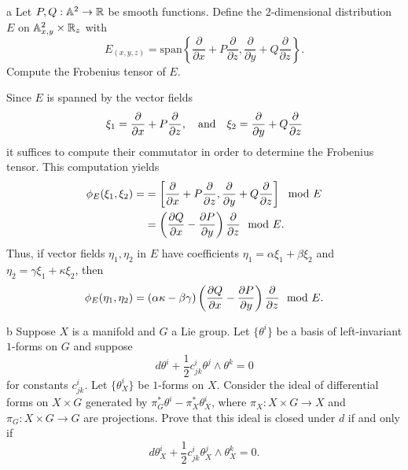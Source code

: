 \documentclass{../../templates/lkx_pset}
\begin{document}
\begin{parts}
	\begin{part}{a}
		Let $P,Q: \mathbb{A}^2 \to \mathbb{R}$ be smooth functions. Define the $2$-dimensional distribution $E$ on $\mathbb{A}^2_{x,y}\times \mathbb{R}_z$ with
		\[
			E_{(x,y,z)} = \textrm{span}\left\{\frac{\partial}{\partial x} + P \frac{\partial}{\partial z}, \frac{\partial}{\partial y} + Q \frac{\partial}{\partial z}\right\}.
		\]
		Compute the Frobenius tensor of $E$.
	\end{part}

	Since $E$ is spanned by the vector fields
	\[
		\xi_1 = \frac{\partial }{\partial x} + P\frac{\partial }{\partial z},\quad\textrm{and}\quad \xi_2 = \frac{\partial }{\partial y}+Q\frac{\partial }{\partial z}
	\]
	it suffices to compute their commutator in order to determine the Frobenius tensor. This computation yields
	\[
		\begin{aligned}
			\phi_E(\xi_1, \xi_2)=
			 & = \left[\frac{\partial }{\partial x} + P\frac{\partial }{\partial z}, \frac{\partial }{\partial y}+Q\frac{\partial }{\partial z} \right]\mod E \\
			 & = \left(\frac{\partial Q}{\partial x} - \frac{\partial P}{\partial y}\right)\frac{\partial }{\partial z} \mod E.
		\end{aligned}
	\]
	Thus, if vector fields $\eta_1, \eta_2$ in $E$ have coefficients $\eta_1 = \alpha \xi_1 + \beta \xi_2$ and $\eta_2 = \gamma \xi_1 + \kappa \xi_2$, then
	\[
		\phi_E(\eta_1, \eta_2) = (\alpha\kappa - \beta\gamma)\left(\frac{\partial Q}{\partial x} - \frac{\partial P}{\partial y}\right)\frac{\partial }{\partial z} \mod E.
	\]

	\begin{part}{b}
		Suppose $X$ is a manifold and $G$ a Lie group. Let $\{\theta^i\}$ be a basis of left-invariant $1$-forms on $G$ and suppose
		\[
			d\theta^i + \frac{1}{2}c^i_{jk} \theta^j\wedge \theta^k = 0
		\]
		for constants $c^i_{jk}$. Let $\{\theta^i_X\}$ be $1$-forms on $X$. Consider the ideal of differential forms on $X\times G$ generated by $\pi_G^*\theta^i - \pi^*_X \theta^i_X$, where $\pi_X : X \times G \to X$ and $\pi_G : X\times G \to G$ are projections. Prove that this ideal is closed under $d$ if and only if
		\[
			d\theta^i_X + \frac{1}{2}c^i_{jk} \theta^j_X \wedge \theta^k_X = 0.
		\]
	\end{part}


\end{parts}
\end{document}
